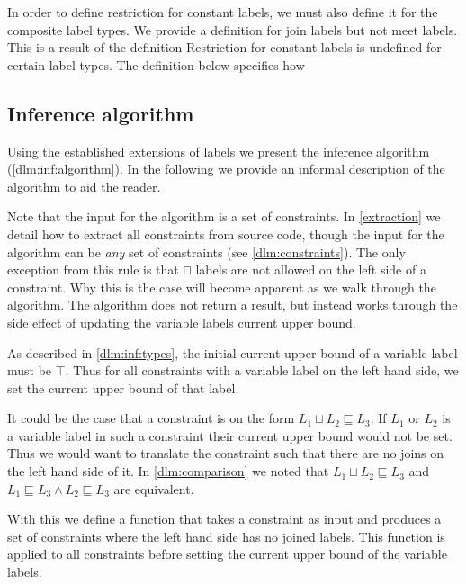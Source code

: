 In order to define restriction for constant labels, we must also define it for the composite label types.
We provide a definition for join labels but not meet labels.
This is a result of the definition
Restriction for constant labels is undefined for certain label types.
The definition below specifies how

\subsection{Inference algorithm}\label{dlm:inf:algsection}
Using the established extensions of labels we present the inference algorithm (\cref{dlm:inf:algorithm}).
In the following we provide an informal description of the algorithm to aid the reader.

Note that the input for the algorithm is a set of constraints.
In \cref{extraction} we detail how to extract all constraints from source code, though the input for the algorithm can be \textit{any} set of constraints (see \cref{dlm:constraints}).
The only exception from this rule is that $\sqcap$ labels are not allowed on the left side of a constraint.
Why this is the case will become apparent as we walk through the algorithm.
The algorithm does not return a result, but instead works through the side effect of updating the variable labels current upper bound.



As described in \cref{dlm:inf:types}, the initial current upper bound of a variable label must be $\top$.
Thus for all constraints with a variable label on the left hand side, we set the current upper bound of that label.

It could be the case that a constraint is on the form $L_1 \sqcup L_2 \sqsubseteq L_3$.
If $L_1$ or $L_2$ is a variable label in such a constraint their current upper bound would not be set.
Thus we would want to translate the constraint such that there are no joins on the left hand side of it.
In \cref{dlm:comparison} we noted that $L_1 \sqcup L_2 \sqsubseteq L_3$ and $L_1 \sqsubseteq L_3 \wedge L_2 \sqsubseteq L_3$ are equivalent.

With this we define a function that takes a constraint as input and produces a set of constraints where the left hand side has no joined labels.
This function is applied to all constraints before setting the current upper bound of the variable labels.

